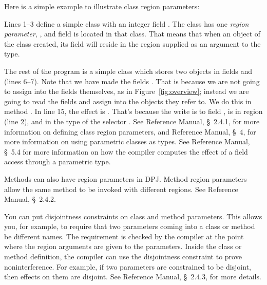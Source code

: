 Here is a simple example to illustrate class region parameters:
%

%
Lines 1--3 define a simple  class with an integer field
.  The class has one \emph{region parameter}, , and
field  is located in that class.  That means that when an
object of the  class created, its  field will reside
in the region supplied as an argument to the type.

The rest of the program is a simple class  which stores
two  objects in fields  and  (lines
6--7).  Note that we have made the fields .  That is
because we are not going to assign into the fields themselves, as in
Figure~\ref{fig:overview}; instead we are going to read the fields and
assign into the objects they refer to.  We do this in method
.  In line 15, the effect is .
That's because the write is to field ,  is in region
 (line 2), and  in the type of the selector
.  See Reference Manual, \S~2.4.1, for more information on
defining class region parameters, and Reference Manual, \S~4, for more
information on using parametric classes as types.  See Reference
Manual, \S~5.4 for more information on how the compiler computes the
effect of a field access through a parametric type.

 Methods can also have region
parameters in DPJ.  Method region parameters allow the same method to
be invoked with different regions.  See Reference Manual, \S~2.4.2.

 You can put
disjointness constraints on class and method parameters.  This allows
you, for example, to require that two parameters coming into a class
or method be different names.  The requirement is checked by the
compiler at the point where the region arguments are given to the
parameters.  Inside the class or method definition, the compiler can
use the disjointness constraint to prove noninterference.  For
example, if two parameters are constrained to be disjoint, then
effects on them are disjoint.  See Reference Manual, \S~2.4.3, for
more details.

